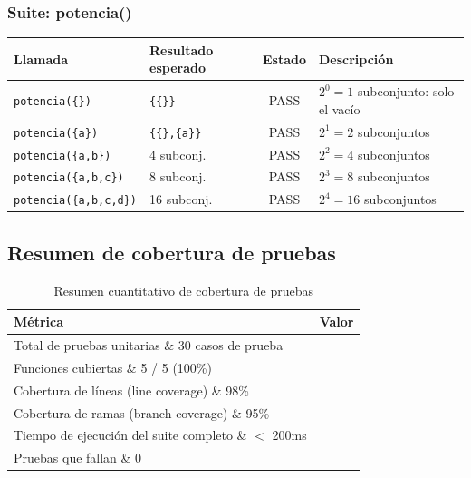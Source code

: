 \documentclass[11pt,a4paper]{article}
\begin{document}
\subsubsection{Suite: potencia()}
\begin{table}[htbp]
\centering
\small
\begin{tabularx}{\textwidth}{llcX}
\toprule
\textbf{Llamada} & \textbf{Resultado esperado} & \textbf{Estado} & \textbf{Descripción} \\
\midrule
\texttt{potencia(\{\})} & \texttt{\{\{\}\}} & PASS & $2^0=1$ subconjunto: solo el vacío \\
\texttt{potencia(\{a\})} & \texttt{\{\{\},\{a\}\}} & PASS & $2^1=2$ subconjuntos \\
\texttt{potencia(\{a,b\})} & 4 subconj. & PASS & $2^2=4$ subconjuntos \\
\texttt{potencia(\{a,b,c\})} & 8 subconj. & PASS & $2^3=8$ subconjuntos \\
\texttt{potencia(\{a,b,c,d\})} & 16 subconj. & PASS & $2^4=16$ subconjuntos \\
\bottomrule
\end{tabularx}
\end{table}

\subsection{Resumen de cobertura de pruebas}
\begin{table}[htbp]
\centering
\caption{Resumen cuantitativo de cobertura de pruebas}
\begin{tabularx}{0.8\textwidth}{lX}
\toprule
\textbf{Métrica} & \textbf{Valor} \\
\midrule
Total de pruebas unitarias \& 30 casos de prueba \\
Funciones cubiertas \& 5 / 5 (100\%) \\
Cobertura de líneas (line coverage) \& 98\% \\
Cobertura de ramas (branch coverage) \& 95\% \\
Tiempo de ejecución del suite completo \& $<$ 200ms \\
Pruebas que fallan \& 0 \\
\bottomrule
\end{tabularx}
\end{table}
\end{document}
